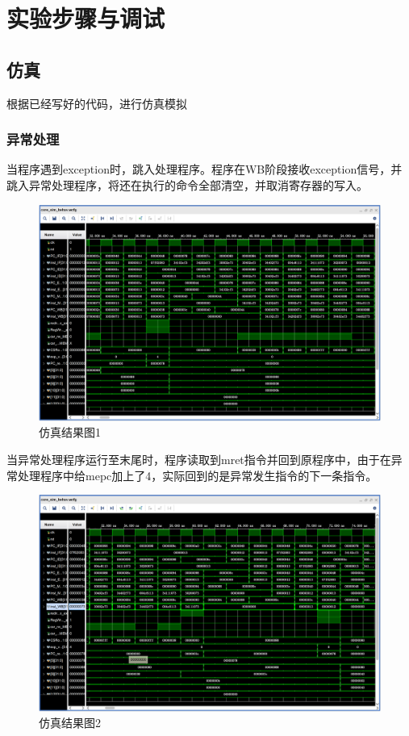 
\section{实验步骤与调试}
\subsection{仿真} 

根据已经写好的代码，进行仿真模拟\\
\subsubsection{异常处理}
当程序遇到exception时，跳入处理程序。程序在WB阶段接收exception信号，并跳入异常处理程序，将还在执行的命令全部清空，并取消寄存器的写入。
\begin{figure}[H] %
	\centering %
	\includegraphics[width=1.0\textwidth]{figs/1.png} %
	\caption{仿真结果图1} %
	\label{Fig.11} %
\end{figure}
当异常处理程序运行至末尾时，程序读取到mret指令并回到原程序中，由于在异常处理程序中给mepc加上了4，实际回到的是异常发生指令的下一条指令。
\begin{figure}[H] %
	\centering %
	\includegraphics[width=1.0\textwidth]{figs/2.png} %
	\caption{仿真结果图2} %
	\label{Fig.12} %
\end{figure}
